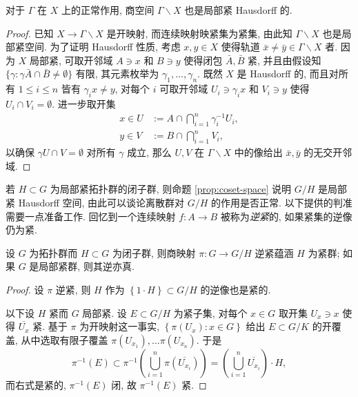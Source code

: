\begin{proposition}\label{prop:quot-Hausdorff}
	对于 $\Gamma$ 在 $X$ 上的正常作用, 商空间 $\Gamma \backslash X$ 也是局部紧 Hausdorff 的.
\end{proposition}
\begin{proof}
	已知 $X \to \Gamma \backslash X$ 是开映射, 而连续映射映紧集为紧集, 由此知 $\Gamma \backslash X$ 也是局部紧空间. 为了证明 Hausdorff 性质, 考虑 $x, y \in X$ 使得轨道 $\bar{x} \neq \bar{y} \in \Gamma \backslash X$ 者. 因为 $X$ 局部紧, 可取开邻域 $A \ni x$ 和 $B \ni y$ 使得闭包 $\bar{A}, \bar{B}$ 紧, 并且由假设知 $\{\gamma : \gamma\bar{A} \cap \bar{B} \neq \emptyset \}$ 有限, 其元素枚举为 $\gamma_1, \ldots, \gamma_n$. 既然 $X$ 是 Hausdorff 的, 而且对所有 $1 \leq i \leq n$ 皆有 $\gamma_i x \neq y$, 对每个 $i$ 可取开邻域 $U_i \ni \gamma_i x$ 和 $V_i \ni y$ 使得 $U_i \cap V_i = \emptyset$. 进一步取开集
	\begin{align*}
		x \in U & := A \cap \bigcap_{i=1}^n \gamma_i^{-1} U_i, \\
		y \in V & := B \cap \bigcap_{i=1}^n V_i,
	\end{align*}
	以确保 $\gamma U \cap V = \emptyset$ 对所有 $\gamma$ 成立, 那么 $U, V$ 在 $\Gamma \backslash X$ 中的像给出 $\bar{x}, \bar{y}$ 的无交开邻域.
\end{proof}

若 $H \subset G$ 为局部紧拓扑群的闭子群, 则命题 \ref{prop:coset-space} 说明 $G/H$ 是局部紧 Hausdorff 空间, 由此可以谈论离散群对 $G/H$ 的作用是否正常. 以下提供的判准需要一点准备工作. 回忆到一个连续映射 $f: A \to B$ 被称为\emph{逆紧}的, 如果紧集的逆像仍为紧.

\begin{lemma}\label{prop:proper-quotient-compact}
	设 $G$ 为拓扑群而 $H \subset G$ 为闭子群, 则商映射 $\pi: G \to G/H$ 逆紧蕴涵 $H$ 为紧群; 如果 $G$ 是局部紧群, 则其逆亦真.
\end{lemma}
\begin{proof}
	设 $\pi$ 逆紧, 则 $H$ 作为 $\left\{ 1 \cdot H \right\} \subset G/H$ 的逆像也是紧的.
	
	以下设 $H$ 紧而 $G$ 局部紧. 设 $E \subset G/H$ 为紧子集, 对每个 $x \in G$ 取开集 $U_x \ni x$ 使得 $\overline{U_x}$ 紧. 基于 $\pi$ 为开映射这一事实, $\left\{\pi(U_x): x \in G \right\}$ 给出 $E \subset G/K$ 的开覆盖, 从中选取有限子覆盖 $\pi(U_{x_1}), \ldots \pi(U_{x_n})$. 于是
	\[ \pi^{-1}(E) \subset \pi^{-1}\left( \bigcup_{i=1}^n \pi\left(\overline{U_{x_i}}\right) \right) = \left( \bigcup_{i=1}^n \overline{U_{x_i}} \right) \cdot H, \]
	而右式是紧的, $\pi^{-1}(E)$ 闭, 故 $\pi^{-1}(E)$ 紧.
\end{proof}

